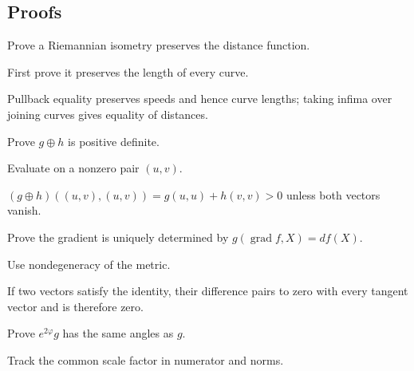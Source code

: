 \subsection*{Proofs}

\begin{exercise}\label{exr:vii20-ped-06}
Prove a Riemannian isometry preserves the distance function.
\end{exercise}

\begin{hint}
First prove it preserves the length of every curve.
\end{hint}

\begin{solution}
Pullback equality preserves speeds and hence curve lengths; taking infima over joining curves gives equality of distances.
\end{solution}

\begin{exercise}\label{exr:vii20-ped-07}
Prove \(g\oplus h\) is positive definite.
\end{exercise}

\begin{hint}
Evaluate on a nonzero pair \((u,v)\).
\end{hint}

\begin{solution}
\((g\oplus h)((u,v),(u,v))=g(u,u)+h(v,v)>0\) unless both vectors vanish.
\end{solution}

\begin{exercise}\label{exr:vii20-ped-08}
Prove the gradient is uniquely determined by \(g(\operatorname{grad}f,X)=df(X)\).
\end{exercise}

\begin{hint}
Use nondegeneracy of the metric.
\end{hint}

\begin{solution}
If two vectors satisfy the identity, their difference pairs to zero with every tangent vector and is therefore zero.
\end{solution}

\begin{exercise}\label{exr:vii20-ped-09}
Prove \(e^{2\varphi}g\) has the same angles as \(g\).
\end{exercise}

\begin{hint}
Track the common scale factor in numerator and norms.
\end{hint}

